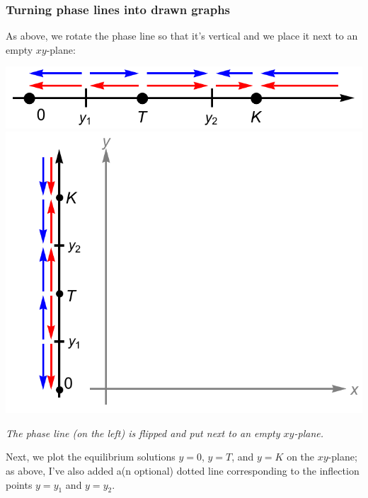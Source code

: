 \documentclass[12pt]{article}
\theoremstyle{definition}
\theoremstyle{underl}
\newcommand{\capt}[1]{\begin{adjustwidth}{0.5in}{0.5in}\centering\small\textit{#1}\end{adjustwidth}}
\begin{document}
	\subsubsection*{Turning phase lines into drawn graphs}
	As above, we rotate the phase line so that it's vertical and we place it next to an empty $xy$-plane:
	\vspace{-1.5mm}
	\begin{center}
		\includegraphics[align=c,scale=0.5]{Ex2_Phase_4}
		\includegraphics[align=c,scale=0.875]{Ex2_xy_1}
		\vspace{1.5mm}
		\capt{The phase line (on the left) is flipped and put next to an empty $xy$-plane.}
	\end{center}
	Next, we plot the equilibrium solutions $y=0$, $y=T$, and $y=K$ on the $xy$-plane; as above, I've also added a(n optional) dotted line corresponding to the inflection points $y=y_1$ and $y=y_2$.
\end{document}
